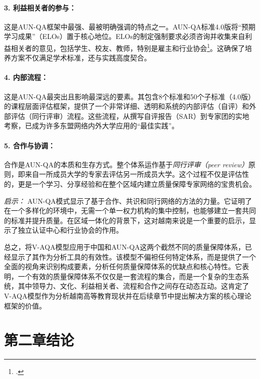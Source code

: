 \paragraph{3. 利益相关者的参与：} 这是AUN-QA框架中最强、最被明确强调的特点之一。AUN-QA标准4.0版将“预期学习成果”（ELOs）置于核心地位。ELOs的制定强制要求必须咨询并收集来自利益相关者的意见，包括学生、校友、教师，特别是雇主和行业协会\footcite{AUN-QAGuide}。这确保了培养方案不仅满足学术标准，还与实践高度契合。

\paragraph{4. 内部流程：} 这是AUN-QA最突出且影响最深远的要素。其包含8个标准和50个子标准（4.0版）的课程层面评估框架，提供了一个非常详细、透明和系统的内部评估（自评）和外部评估（同行评审）流程。这些流程，从撰写自评报告（SAR）到专家团的实地考察，已成为许多东盟网络内外大学应用的“最佳实践”。

\paragraph{5. 合作与协调：} 合作是AUN-QA的本质和生存方式。整个体系运作基于\textit{同行评审（peer review）}原则，即来自一所成员大学的专家去评估另一所成员大学。这个过程不仅是评估性的，更是一个学习、分享经验和在整个区域内建立质量保障专家网络的宝贵机会。

\textit{启示：} AUN-QA模式显示了基于合作、共识和同行网络的方法的力量。它证明了在一个多样化的环境中，无需一个单一权力机构的集中控制，也能够建立一套共同的标准并提升质量。在区域一体化的背景下，这对越南来说是一个重要的启示，显示了独立认证中心和行业协会的作用。

\bigskip %

总之，将V-AQA模型应用于中国和AUN-QA这两个截然不同的质量保障体系，已经显示了其作为分析工具的有效性。该模型不偏袒任何特定体系，而是提供了一个全面的视角来识别构成要素，分析任何质量保障体系的优缺点和核心特性。它表明，一个有效的质量保障体系不仅仅是一套流程的集合，而是一个复杂的生态系统，其中领导力、文化、利益相关者、流程和合作之间存在动态互动。这肯定了V-AQA模型作为分析越南高等教育现状并在后续章节中提出解决方案的核心理论框架的价值。






\section*{第二章结论}
\label{sec:ket_luan_chuong_2_final}

